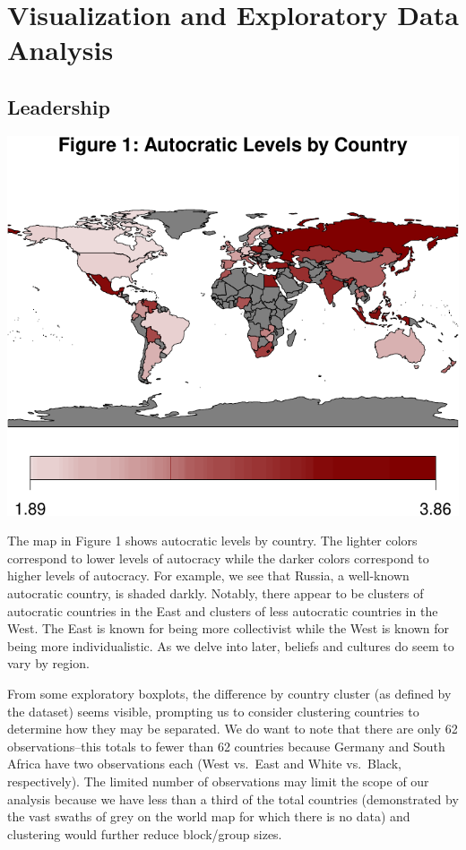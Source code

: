 \documentclass[
]{article}
\begin{document}
\hypertarget{visualization-and-exploratory-data-analysis}{%
\section{Visualization and Exploratory Data
Analysis}\label{visualization-and-exploratory-data-analysis}}

\hypertarget{leadership}{%
\subsection{Leadership}\label{leadership}}

\begin{center}\includegraphics[width=0.95\linewidth]{globe_report_files/figure-latex/leadership-1} \end{center}

The map in Figure 1 shows autocratic levels by country. The lighter
colors correspond to lower levels of autocracy while the darker colors
correspond to higher levels of autocracy. For example, we see that
Russia, a well-known autocratic country, is shaded darkly. Notably,
there appear to be clusters of autocratic countries in the East and
clusters of less autocratic countries in the West. The East is known for
being more collectivist while the West is known for being more
individualistic. As we delve into later, beliefs and cultures do seem to
vary by region.

From some exploratory boxplots, the difference by country cluster (as
defined by the dataset) seems visible, prompting us to consider
clustering countries to determine how they may be separated. We do want
to note that there are only 62 observations--this totals to fewer than
62 countries because Germany and South Africa have two observations each
(West vs.~East and White vs.~Black, respectively). The limited number of
observations may limit the scope of our analysis because we have less
than a third of the total countries (demonstrated by the vast swaths of
grey on the world map for which there is no data) and clustering would
further reduce block/group sizes.
\end{document}
